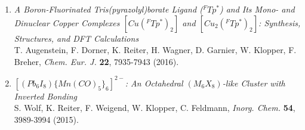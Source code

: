 \begin{enumerate}
\item \textit{A Boron-Fluorinated Tris(pyrazolyl)borate Ligand ($^FTp^*$) and Its Mono- and Dinuclear Copper Complexes $[Cu(^FTp^*)_2]$ and $[Cu_2(^FTp^*)_2]$: Synthesis, Structures, and DFT Calculations}\\
T. Augenstein, F. Dorner, K. Reiter, H. Wagner, D. Garnier, W. Klopper, F. Breher, \textit{Chem. Eur. J.} \textbf{22}, 7935-7943 (2016).

\item \textit{$[(Pb_6I_8)\{Mn(CO)_5\}_6]^{2-}$: An Octahedral $(M_6X_8)$-like Cluster with Inverted Bonding}\\
S. Wolf, K. Reiter, F. Weigend, W. Klopper, C. Feldmann, \textit{Inorg. Chem.} \textbf{54}, 3989-3994 (2015).
\end{enumerate}